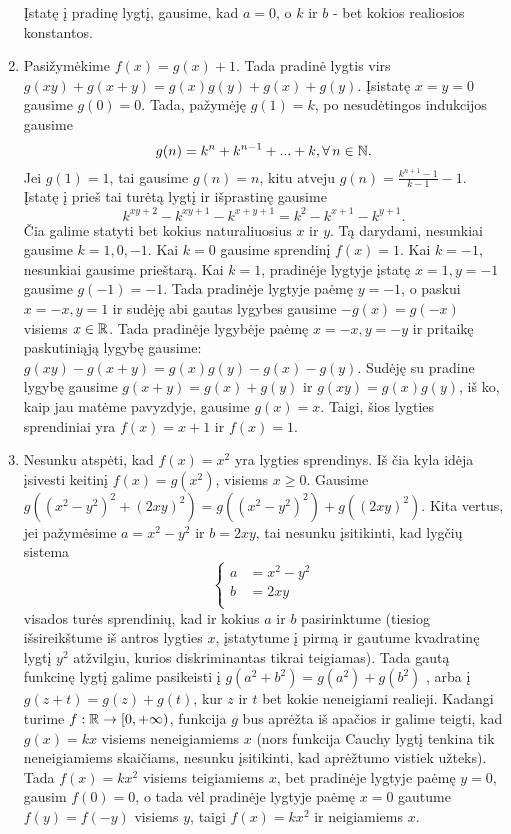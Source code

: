\begin{enumerate}
Įstatę į pradinę lygtį, gausime, kad $a=0$, o $k$ ir $b$ - bet kokios
realiosios konstantos.
\item 
Pasižymėkime $f(x)=g(x)+1$. Tada pradinė lygtis virs
$g(xy)+g(x+y)=g(x)g(y)+g(x)+g(y)$. Įsistatę $x=y=0$ gausime $g(0)=0$.
Tada, pažymėję $g(1)=k$, po nesudėtingos indukcijos gausime
$$g(n)=k^{n}+k^{n-1}+...+k, \forall \, n\in\mathbb N.$$ Jei $g(1)=1$, tai gausime
$g(n)=n$, kitu atveju $g(n)=\frac{k^{n+1}-1}{k-1}-1$. Įstatę į
prieš tai turėtą lygtį ir išprastinę gausime
$$k^{xy+2}-k^{xy+1}-k^{x+y+1}=k^{2}-k^{x+1}-k^{y+1}.$$ Čia galime
statyti bet kokius naturaliuosius $x$ ir $y$. Tą darydami, nesunkiai
gausime $k=1,0,-1$. Kai $k=0$ gausime sprendinį $f(x)=1$. Kai $k=-1$,
nesunkiai gausime prieštarą. Kai $k=1$, pradinėje lygtyje įstatę $x=1,
y=-1$ gausime $g(-1)=-1$. Tada pradinėje lygtyje paėmę $y=-1$, o
paskui $x=-x, y=1$ ir sudėję abi gautas lygybes gausime $-g(x)=g(-x)$
visiems $x\in\mathbb R$. Tada pradinėje lygybėje paėmę $x=-x,y=-y$ ir
pritaikę paskutiniąją lygybę gausime:
$g(xy)-g(x+y)=g(x)g(y)-g(x)-g(y)$. Sudėję su pradine lygybę
gausime $g(x+y)=g(x)+g(y)$ ir $g(xy)=g(x)g(y)$, iš ko, kaip jau matėme
pavyzdyje, gausime $g(x)=x$. Taigi, šios lygties sprendiniai yra
$f(x)=x+1$ ir $f(x)=1$.
\item 
Nesunku atspėti, kad $f(x)=x^2$ yra lygties sprendinys. Iš čia kyla
idėja įsivesti keitinį $f(x)=g(x^2)$, visiems $x\geq 0$. Gausime
$g((x^2-y^2)^2+(2xy)^2)=g((x^2-y^2)^2)+g((2xy)^2)$. Kita vertus, jei
pažymėsime $a=x^2-y^2$ ir $b=2xy$, tai nesunku įsitikinti, kad lygčių
sistema
$$\left\{\begin{array}{cc}
a&=x^2-y^2\\
b&=2xy\\
\end{array}  \right.$$ visados turės sprendinių, kad ir kokius $a$ ir
$b$ pasirinktume (tiesiog išsireikštume iš antros lygties $x$,
įstatytume į pirmą ir gautume kvadratinę lygtį $y^2$ atžvilgiu, kurios
diskriminantas tikrai teigiamas). Tada gautą funkcinę lygtį galime
pasikeisti į $g(a^2+b^2)=g(a^2)+g(b^2)$ , arba į $g(z+t)=g(z)+g(t)$,
kur $z$ ir $t$ bet kokie neneigiami realieji. Kadangi turime
$f:\mathbb R\rightarrow[0,+\infty)$, funkcija $g$ bus aprėžta iš apačios ir
galime teigti, kad $g(x)=kx$ visiems neneigiamiems $x$ (nors funkcija
Cauchy lygtį tenkina tik neneigiamiems skaičiams, nesunku įsitikinti,
kad aprėžtumo vistiek užteks). Tada $f(x)=kx^2$ visiems teigiamiems
$x$, bet pradinėje lygtyje paėmę $y=0$, gausim $f(0)=0$, o tada vėl
pradinėje lygtyje paėmę $x=0$ gautume $f(y)=f(-y)$ visiems $y$, taigi
$f(x)=kx^2$ ir neigiamiems $x$.

\end{enumerate}
